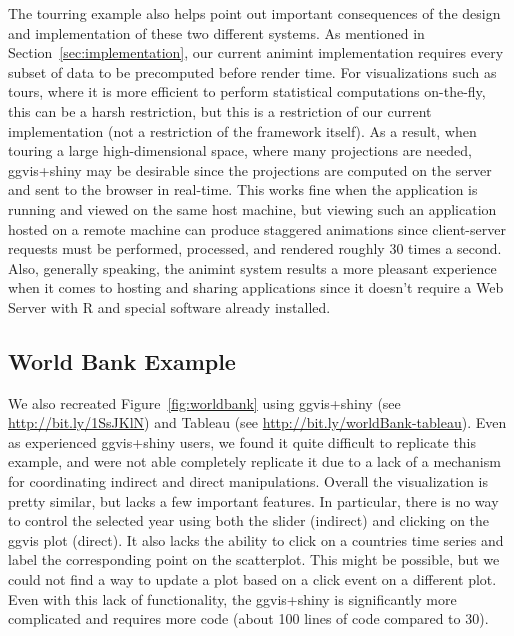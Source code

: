 \documentclass[journal]{vgtc}\usepackage[]{graphicx}\usepackage[]{color}
\begin{document}
The tourring example also helps point out important consequences of the
design and implementation of these two different systems. As mentioned in 
Section~\ref{sec:implementation}, our current animint implementation requires 
every subset of data to be precomputed before render time.
For visualizations such as tours, where it is more efficient to 
perform statistical computations on-the-fly, this can be a harsh restriction, 
but this is a restriction of our current implementation 
(not a restriction of the framework itself).
As a result, when touring a large high-dimensional space, where many 
projections are needed, ggvis+shiny may be desirable since the projections are 
computed on the server and sent to the browser in real-time. This works fine
when the application is running and viewed on the same host machine, but
viewing such an application hosted on a remote machine can produce
staggered animations since client-server requests must be performed, processed,
and rendered roughly 30 times a second. Also, generally speaking, 
the animint system results a more pleasant experience when it comes to hosting 
and sharing applications since it doesn't require a Web Server with R and 
special software already installed.

\subsection{World Bank Example}

We also recreated Figure~\ref{fig:worldbank} using ggvis+shiny (see 
\url{http://bit.ly/1SsJKlN}) and Tableau (see 
\url{http://bit.ly/worldBank-tableau}). 
Even as experienced ggvis+shiny users, we found it quite difficult to
replicate this example, and were not able completely replicate it 
due to a lack of a mechanism for coordinating indirect and direct
manipulations. Overall the visualization is pretty similar, but 
lacks a few important features. 
In particular, there is no way to control the selected
year using both the slider (indirect) and clicking on the ggvis plot (direct).
It also lacks the ability to click on a countries time series and label
the corresponding point on the scatterplot. This might be possible, but we
could not find a way to update a plot based on a click event on a different
plot. Even with this lack of functionality, the ggvis+shiny is significantly
more complicated and requires more code 
(about 100 lines of code compared to 30).

\end{document}
